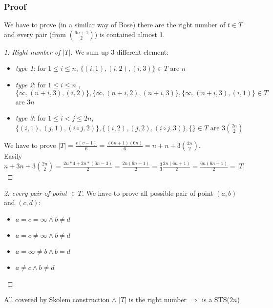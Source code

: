 \begin{frame}
\frametitle{Proof}
We have to prove (in a similar way of Bose) there are the right number of $t \in T$ and every pair (from $\binom{6n + 1}{2}$) is contained almost 1.
\begin{proof}[1: Right number of $|T|$]
We sum up 3 different element:
\small
\begin{itemize}
	\item \textit{type 1}: \textcolor{black!55}{for $1 \le i \le n$, $\{ (i,1), (i,2), (i,3)\} \in T$} are $n$
	\item \textit{type 2}: \textcolor{black!55}{ for $1 \le i \le n$ , $\{\infty, (n+i,3),(i,2)\},\{\infty,(n+i,2),(n+i,3)\},\{\infty,(n+i,3),(i,1) \} \in T$} are $3n$
	\item \textit{type 3}: \textcolor{black!55}{for $1 \le i < j \le 2n$,$\{(i,1),(j,1),(i \circ j,2) \}, \{(i,2),(j,2),(i \circ j,3)\},\{\} \in T$} are $3\binom{2n}{2}$
\end{itemize}
We have to prove $|T|= \frac{v(v-1)}{6} = \frac{(6n+1)(6n)}{6}= n + n + 3\binom{2n}{2}$.\\
Easily $n + 3n + 3\binom{2n}{2}=\frac{2n*4+ 2n*(6n-3)}{2}= \frac{2n(6n +1 )}{2}= \frac{3}{3}\frac{2n(6n +1 )}{2}=\frac{6n(6n +1 )}{2}=|T|$
\end{proof}
\end{frame}

\begin{frame}
\begin{proof}[2: every pair of point $\in T$]
	We have to prove all possible pair of point $(a,b)$ and $(c,d)$:
	\begin{itemize}
		\item $a=c=\infty \wedge b \not = d$
		\item $a=c\not = \infty \wedge b \not = d$
		\item $a= \infty \not = b \wedge b = d$
		\item $a\not =c \wedge b \not = d $
	\end{itemize}
\end{proof}
\pause
{}
\begin{block}{}
All covered by Skolem construction $\wedge$ $|T|$ is the right number $\Rightarrow$ is a STS($2n$)
\end{block}

\end{frame}

